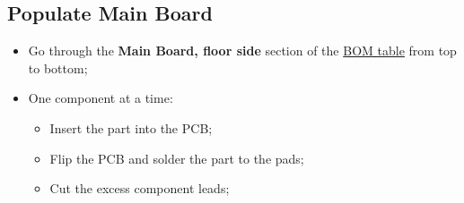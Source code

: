 \documentclass[a4paper,12pt]{article}
\begin{document}
\restoregeometry{}





\subsection{Populate Main Board}

\begin{itemize}
  \item Go through the \textbf{Main Board, floor side} section of the
    \hyperref[tbl:BOM]{BOM table} from top to bottom;
  \item One component at a time:
    \begin{itemize}
      \item Insert the part into the PCB;
      \item Flip the PCB and solder the part to the pads;
      \item Cut the excess component leads;
    \end{itemize}
\end{itemize}
\end{document}
